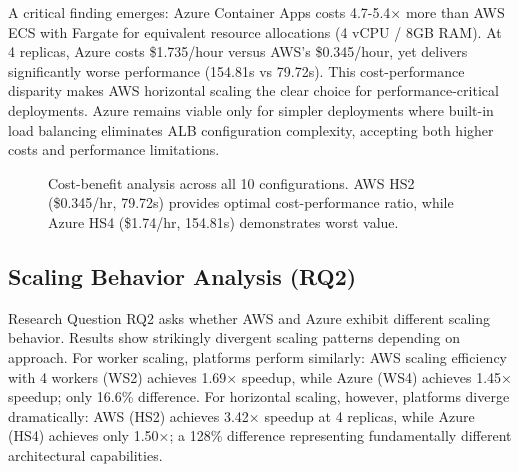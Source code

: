 A critical finding emerges: Azure Container Apps costs 4.7-5.4× more than AWS ECS with Fargate for equivalent resource allocations (4 vCPU / 8GB RAM). At 4 replicas, Azure costs \$1.735/hour versus AWS's \$0.345/hour, yet delivers significantly worse performance (154.81s vs 79.72s). This cost-performance disparity makes AWS horizontal scaling the clear choice for performance-critical deployments. Azure remains viable only for simpler deployments where built-in load balancing eliminates ALB configuration complexity, accepting both higher costs and performance limitations.

\begin{figure}[!htbp]
\centering
{}
\caption{Cost-benefit analysis across all 10 configurations. AWS HS2 (\$0.345/hr, 79.72s) provides optimal cost-performance ratio, while Azure HS4 (\$1.74/hr, 154.81s) demonstrates worst value.}
\label{fig:cost_benefit}
\end{figure}

\subsection{Scaling Behavior Analysis (RQ2)}

Research Question RQ2 asks whether AWS and Azure exhibit different scaling behavior. Results show strikingly divergent scaling patterns depending on approach. For worker scaling, platforms perform similarly: AWS scaling efficiency with 4 workers (WS2) achieves 1.69× speedup, while Azure (WS4) achieves 1.45× speedup; only 16.6\% difference. For horizontal scaling, however, platforms diverge dramatically: AWS (HS2) achieves 3.42× speedup at 4 replicas, while Azure (HS4) achieves only 1.50×; a 128\% difference representing fundamentally different architectural capabilities.


